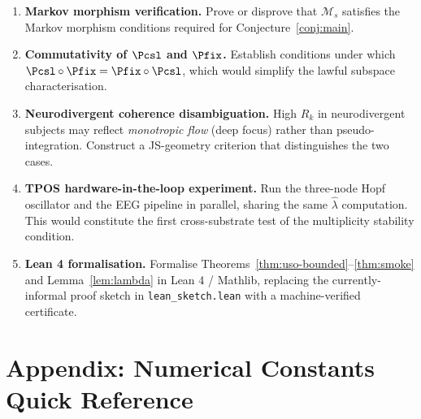 \documentclass[12pt,a4paper]{article}
\theoremstyle{plain}
\theoremstyle{definition}
\begin{document}
\begin{enumerate}[label=\textbf{OP\arabic*.}]
  \item \textbf{Markov morphism verification.}
        Prove or disprove that $\mathcal{M}_s$ satisfies the Markov morphism
        conditions required for Conjecture~\ref{conj:main}.

  \item \textbf{Commutativity of $\Pcsl$ and $\Pfix$.}
        Establish conditions under which $\Pcsl\circ\Pfix = \Pfix\circ\Pcsl$,
        which would simplify the lawful subspace characterisation.

  \item \textbf{Neurodivergent coherence disambiguation.}
        High $R_k$ in neurodivergent subjects may reflect \emph{monotropic flow}
        (deep focus) rather than pseudo-integration.  Construct a JS-geometry
        criterion that distinguishes the two cases.

  \item \textbf{TPOS hardware-in-the-loop experiment.}
        Run the three-node Hopf oscillator and the EEG pipeline in parallel,
        sharing the same $\hat\lambda$ computation.  This would constitute
        the first cross-substrate test of the multiplicity stability condition.

  \item \textbf{Lean 4 formalisation.}
        Formalise Theorems~\ref{thm:uso-bounded}--\ref{thm:smoke} and
        Lemma~\ref{lem:lambda} in Lean 4 / Mathlib, replacing the
        currently-informal proof sketch in \texttt{lean\_sketch.lean}
        with a machine-verified certificate.
\end{enumerate}

\appendix
\section*{Appendix: Numerical Constants Quick Reference}
\label{app:constants}
\end{document}
